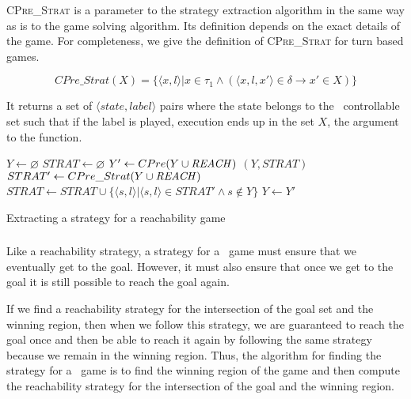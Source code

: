 \textsc{CPre\_Strat} is a parameter to the strategy extraction algorithm in the same way as \textsc{\cpre} is to the game solving algorithm. Its definition depends on the exact details of the game. For completeness, we give the definition of \textsc{CPre\_Strat} for turn based games. 

\begin{equation}
    CPre\_Strat(X) = \{\langle x, l \rangle | x \in \tau_1 \wedge (\langle x, l, x' \rangle \in \delta \rightarrow x' \in X)\}
\end{equation}

It returns a set of $\langle state, label \rangle$ pairs where the state belongs to the \pone\ controllable set such that if the label is played, execution ends up in the set $X$, the argument to the function.

\begin{algorithm}[t]
    \begin{algorithmic}[1]

\State $Y \gets \varnothing$ \label{l:rs:init}
\State $STRAT \gets \varnothing$
    \Loop
        \State $Y' \gets CPre(Y \cup \mathit{REACH})$
            \State\Return $(Y, STRAT)$
        \EndIf
        \State $STRAT' \gets CPre\_Strat(Y \cup \mathit{REACH})$ \label{l:rs:cs}
        \State $STRAT \gets STRAT \cup \{\langle s, l \rangle | \langle s, l \rangle \in STRAT' \wedge s \notin Y\}$  \label{l:rs:as}
        \State $Y \gets Y'$
    \EndLoop
\EndFunction

\end{algorithmic}
\caption{Extracting a strategy for a reachability game}
\label{alg:reach_strat}
\end{algorithm}

\subsubsection{\buchi}

Like a reachability strategy, a strategy for a \buchi\ game must ensure that we eventually get to the goal. However, it must also ensure that once we get to the goal it is still possible to reach the goal again. 

If we find a reachability strategy for the intersection of the goal set and the winning region, then when we follow this strategy, we are guaranteed to reach the goal once and then be able to reach it again by following the same strategy because we remain in the winning region. Thus, the algorithm for finding the strategy for a \buchi\ game is to find the winning region of the game and then compute the reachability strategy for the intersection of the goal and the winning region.

